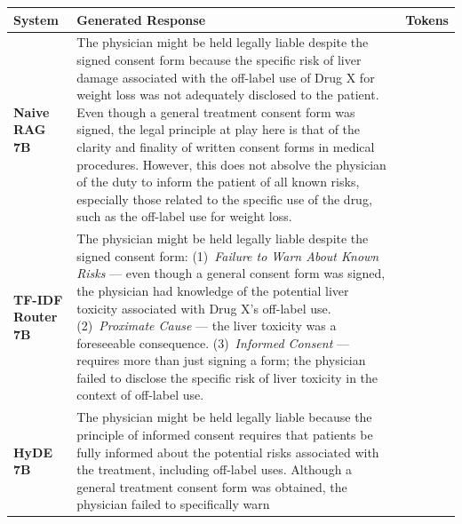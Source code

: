 \documentclass[a4paper,fleql,doubleblind]{cas-sc}
\begin{document}
\clearpage
\vspace{6pt plus 4pt minus 3pt}
\begin{center}
\begingroup
{}
\label{tab:casestudy_comparison}
\renewcommand{\arraystretch}{1.4}
\footnotesize
\begin{tabular}{m{2.3cm} | m{10.0cm} | >{\centering\arraybackslash}m{1.5cm}}
\toprule
\textbf{System} & \textbf{Generated Response} & \textbf{Tokens} \\
\midrule
\textbf{Naive RAG 7B}
& The physician might be held legally liable despite the signed consent form
because the specific risk of liver damage associated with the off-label use of
Drug X for weight loss was not adequately disclosed to the patient. Even though
a general treatment consent form was signed, the legal principle at play here
is that of the clarity and finality of written consent forms in medical
procedures. However, this does not absolve the physician of the duty to inform
the patient of all known risks, especially those related to the specific use of
the drug, such as the off-label use for weight loss. & 102 \\
\midrule
\textbf{TF-IDF Router 7B}
& The physician might be held legally liable despite the signed consent form:
(1)~\textit{Failure to Warn About Known Risks} --- even though a general
consent form was signed, the physician had knowledge of the potential liver
toxicity associated with Drug X's off-label use.
(2)~\textit{Proximate Cause} --- the liver toxicity was a foreseeable
consequence.
(3)~\textit{Informed Consent} --- requires more than just signing a form; the
physician failed to disclose the specific risk of liver toxicity in the context
of off-label use. & 89 \\
\midrule
\textbf{HyDE 7B}
& The physician might be held legally liable because the principle of informed
consent requires that patients be fully informed about the potential risks
associated with the treatment, including off-label uses. Although a general
treatment consent form was obtained, the physician failed to specifically warn

\end{tabular}
\end{center}
\end{document}
